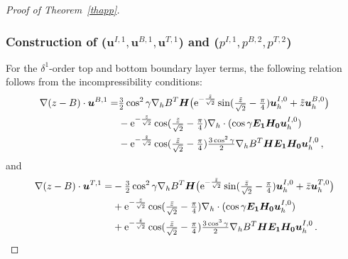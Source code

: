 \documentclass[pdflatex,sn-mathphys-num]{sn-jnl}%
\theoremstyle{thmstyleone}%
\theoremstyle{thmstyletwo}%
\theoremstyle{thmstylethree}%
\theoremstyle{thmstyletwo}
\begin{document}
\begin{proof}[Proof of Theorem~{\upshape\ref{thapp}}]
\subsubsection{Construction of ($\boldsymbol{u}^{I,1}, \boldsymbol{u}^{B,1}, \boldsymbol{u}^{T,1}$)  and (${p}^{I,1}, {p}^{B,2}, {p}^{T,2}$)}\label{subsec2.2.2}
For the $\delta^1$-order top and bottom boundary layer terms, the following relation follows from the incompressibility conditions:
\begin{align}\label{2.17}
	\nabla(z-B)\cdot \boldsymbol{u}^{B,1}
	=&	
	\tfrac{3}{2}\cos^2\gamma\nabla_{h}B^T\boldsymbol{H}\big(
	\mathrm{e}^{-\frac{\tilde z}{\sqrt 2}}\sin(\tfrac{\tilde z}{\sqrt 2}-\tfrac\pi4)\boldsymbol{u}^{I,0}_h+\tilde{z}\boldsymbol u_h^{B,0}
	\big)\notag\\
	&-\mathrm{e}^{-\frac{\tilde z}{\sqrt 2}}\cos(\tfrac{\tilde z}{\sqrt 2}-\tfrac\pi4)
	\nabla_h\cdot(\cos\gamma\boldsymbol{E_1}\boldsymbol{H_0}\boldsymbol{u}^{I,0}_h)
	\notag\\
	&-\mathrm{e}^{-\frac{\tilde z}{\sqrt 2}}\cos(\tfrac{\tilde z}{\sqrt 2}-\tfrac\pi4)
	\tfrac{3\cos^2\gamma}{2}\nabla_{h}B^T\boldsymbol{H}\boldsymbol{E_1}\boldsymbol{H_0}\boldsymbol{u}^{I,0}_h\,,
\end{align}
and
\begin{align}\label{2.18}
	\nabla(z-B)\cdot \boldsymbol{u}^{T,1}
	=
	&
	-\tfrac{3}{2}\cos^2\gamma\nabla_{h}B^T\boldsymbol{H}\big(
	\mathrm{e}^{-\frac{\bar z}{\sqrt 2}}\sin(\tfrac{\bar z}{\sqrt 2}-\tfrac\pi4)\boldsymbol{u}^{I,0}_h+\bar{z}\boldsymbol u_h^{T,0}
	\big)\notag\\
	&+\mathrm{e}^{-\frac{\bar z}{\sqrt 2}}\cos(\tfrac{\bar z}{\sqrt 2}-\tfrac\pi4)
	\nabla_h\cdot(\cos\gamma\boldsymbol{E_1}\boldsymbol{H_0}\boldsymbol{u}^{I,0}_h)
	\notag\\
	&+\mathrm{e}^{-\frac{\bar z}{\sqrt 2}}\cos(\tfrac{\bar z}{\sqrt 2}-\tfrac\pi4)\tfrac{3\cos^3\gamma}{2}\nabla_{h}B^T\boldsymbol{H}\boldsymbol{E_1}\boldsymbol{H_0}\boldsymbol{u}^{I,0}_h\,.
\end{align}




\end{proof}
\end{document}
